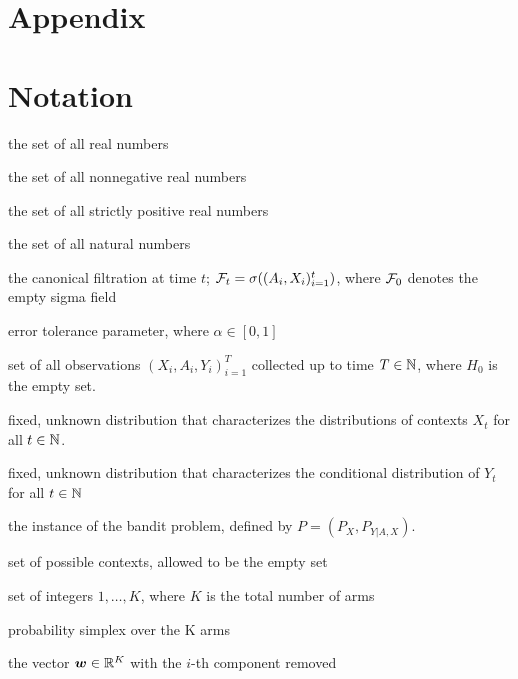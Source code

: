 \documentclass{article}
\begin{document}
\newpage






\newpage
\begin{appendices}
\renewcommand{\thesection}{A.\arabic{section}} %

\section*{Appendix}


\section{Notation}\label{app:notation_table}

\begin{description}[
  leftmargin=2.2cm,
  labelwidth=2cm,
  labelsep=.2cm,
  parsep=0mm,
  itemsep=2pt
  ]
\item[$\RR$] the set of all real numbers
\item[$\RR_+$] the set of all nonnegative real numbers
\item[$\RR_{++}$] the set of all strictly positive real numbers
\item[$\NN$] the set of all natural numbers
\item[$\Fcal_t$] the canonical filtration at time $t$; $\mathcal{F}_t =\sigma ((A_i, X_i)_{i=1}^t)$, where $\mathcal{F}_0$ denotes the empty sigma field
\item[$\alpha$] error tolerance parameter, where $\alpha \in [0,1]$
\item[$H_T$] set of all observations $(X_i, A_i, Y_i)_{i=1}^T$ collected up to time $T \in \mathbb{N}$, where $H_0$ is the empty set. 
\item [$P_X$] fixed, unknown distribution that characterizes the distributions of contexts $X_t$ for all $t \in \mathbb{N}$.
\item [$P_{Y|A,X}$] fixed, unknown distribution that characterizes the conditional distribution of $Y_t$ for all $t \in \mathbb{N}$
\item [$P$] the instance of the bandit problem, defined by $P = (P_X, P_{Y|A,X})$. 
\item [$\Xcal$] set of possible contexts, allowed to be the empty set
\item[${[}K{]}$] set of integers $1,\ldots, K$, where $K$ is the total number of arms
\item[$\Delta^K$] probability simplex over the K arms
\item[$\bm{w}(-i)$] the vector $\boldsymbol{w} \in \mathbb{R}^K$ with the $i$-th component removed

\end{description}
\end{appendices}
\end{document}
